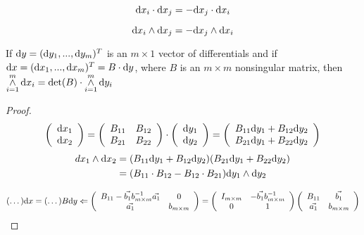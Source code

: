 	\begin{definition}
		$$\mathrm{d} x_i \cdot \mathrm{d} x_j = -\mathrm{d} x_j \cdot \mathrm{d} x_i$$
	\end{definition}

	\begin{definition}
		$$\mathrm{d} x_i \wedge \mathrm{d} x_j = -\mathrm{d} x_j \wedge \mathrm{d} x_i$$
	\end{definition}

	
	
	\begin{theorem}
		If $\mathrm{d} y=(\mathrm{d} y_1,...,\mathrm{d} y_m)^T$ is an $m\times 1$ vector of differentials and if $\mathrm{d} x = (\mathrm{d} x_1, ..., \mathrm{d} x_m)^T=B\cdot \mathrm{d} y$, where $B$ is an $m\times m$ nonsingular matrix, then $\mathop{\wedge}\limits_{i=1}^m \mathrm{d} x_i = \det(B)\cdot \mathop{\wedge}\limits_{i=1}^m \mathrm{d} y_i$
	\end{theorem}

	\begin{proof}
		$$
		\left(
			\begin{array}{c}
				\mathrm{d} x_1\\
				\mathrm{d} x_2
			\end{array}
		\right)
		=
		\left(
			\begin{array}{cc}
				B_{11} & B_{12}\\
				B_{21}&B_{22}		
			\end{array}
		\right)\cdot
		\left(
			\begin{array}{c}
				\mathrm{d} y_1\\
				\mathrm{d} y_2
			\end{array}
		\right)
		=
		\left(
			\begin{array}{c}
				B_{11} \mathrm{d} y_1 + B_{12} \mathrm{d} y_2\\
				B_{21}\mathrm{d} y_1 + B_{22} \mathrm{d} y_2
			\end{array}
		\right)
		$$
		\begin{align*}
			d x_1 \wedge \mathrm{d} x_2 & = (B_{11}\mathrm{d} y_1 + B_{12}\mathrm{d} y_2)(B_{21}\mathrm{d} y_1 + B_{22}\mathrm{d} y_2)\\
			&=(B_{11}\cdot B_{12}-B_{12}\cdot B_{21})\mathrm{d} y_1 \wedge \mathrm{d} y_2
		\end{align*}
	
	$$ (\dots )\mathrm{d} x = (\dots)B\mathrm{d} y\Leftarrow
	\left(
		\begin{array}{cc}
			B_{11} - \vec{b_1}b_{m\times m}^{-1}\vec{a_1} & 0\\
			\vec{a_1} & b_{m\times m}
		\end{array}
	\right)
	= 
	\left(
		\begin{array}{cc}
			I_{m\times m} & -\vec{b_1}b^{-1}_{m\times m}\\
			0&1
		\end{array}
	\right)
	\left(
		\begin{array}{cc}
			B_{11} & \vec{b_1}\\
			\vec{a_1} & b_{m\times m}
		\end{array}
	\right)
	$$
	\end{proof}

